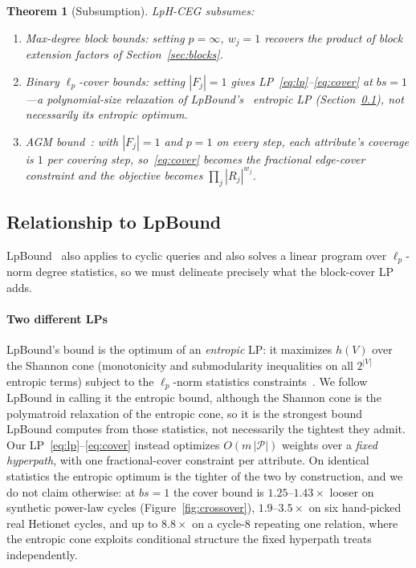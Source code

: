 \documentclass[conference]{IEEEtran}
\newcommand{\rel}{R}
\newcommand{\block}{F}
\newtheorem{theorem}{Theorem}
\begin{document}
\begin{theorem}[Subsumption]
\label{thm:subsumption}
LpH-CEG subsumes:
\begin{enumerate}
\item Max-degree block bounds: setting $p = \infty$,
  $w_j = 1$ recovers the product of block extension factors of Section~\ref{sec:blocks}.
\item Binary $\ell_p$-cover bounds: setting $|\block_j| = 1$ gives
  LP~\eqref{eq:lp}--\eqref{eq:cover} at $bs{=}1$---a polynomial-size
  relaxation of LpBound's~\cite{zhang2025lpbound} entropic LP
  (Section~\ref{sec:vs-lpbound}), not necessarily its entropic optimum.
\item AGM bound~\cite{atserias2008agm}: with $|\block_j|{=}1$ and $p{=}1$ on every step,
  each attribute's coverage is $1$ per covering step, so~\eqref{eq:cover}
  becomes the fractional edge-cover constraint and the objective becomes
  $\prod_j |\rel_j|^{w_j}$.
\end{enumerate}
\end{theorem}

\subsection{Relationship to LpBound}
\label{sec:vs-lpbound}

LpBound~\cite{zhang2025lpbound} also applies to cyclic queries and also
solves a linear program over $\ell_p$-norm degree statistics, so we must
delineate precisely what the block-cover LP adds.

\paragraph{Two different LPs}
LpBound's bound is the optimum of an \emph{entropic} LP: it maximizes
$h(V)$ over the Shannon cone (monotonicity and submodularity
inequalities on all $2^{|V|}$ entropic terms) subject to the
$\ell_p$-norm statistics constraints~\cite{zhang2025lpbound,abokhamis2024lpnorm}.
We follow LpBound in calling it the entropic bound, although the Shannon
cone is the polymatroid relaxation of the entropic cone, so it is the
strongest bound LpBound computes from those statistics, not necessarily
the tightest they admit.
Our LP~\eqref{eq:lp}--\eqref{eq:cover} instead optimizes
$O(m\,|\mathcal{P}|)$ weights over a \emph{fixed hyperpath}, with one
fractional-cover constraint per attribute.
On identical statistics the entropic optimum is the tighter of the two by
construction, and we do not claim otherwise: at $bs{=}1$ the cover bound
is $1.25$--$1.43\times$ looser on synthetic power-law cycles
(Figure~\ref{fig:crossover}), $1.9$--$3.5\times$ on six hand-picked
real Hetionet cycles, and up to $8.8\times$ on a cycle-$8$ repeating one relation, where the entropic cone exploits
conditional structure the fixed hyperpath treats independently.
\end{document}
